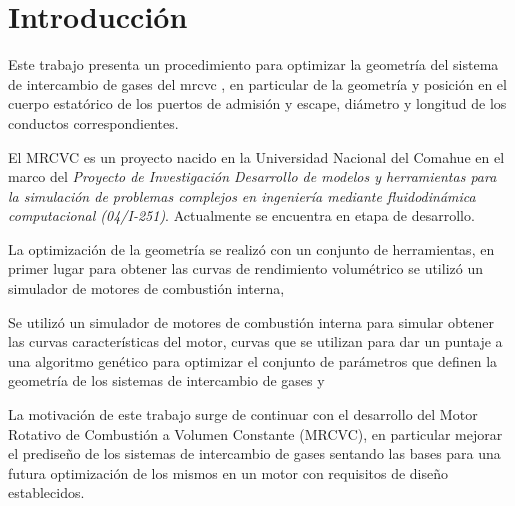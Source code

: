 \chapter{Introducción}

Este trabajo presenta un procedimiento para optimizar la geometría del sistema
de intercambio de gases del \gls{mrcvc}
\cite{toth}, en particular de la geometría y posición en el cuerpo estatórico
de los puertos de admisión y escape, diámetro y longitud de los conductos
correspondientes.

El MRCVC es un proyecto nacido en la Universidad Nacional del Comahue en el
marco del \emph{Proyecto de Investigación Desarrollo de modelos y herramientas
para la simulación de problemas complejos en ingeniería mediante
fluidodinámica computacional (04/I-251)}. Actualmente se encuentra en etapa
de desarrollo.

La optimización de la geometría se realizó con un conjunto de herramientas, en
primer lugar para obtener las curvas de rendimiento volumétrico se utilizó un
simulador de motores de combustión interna, 

Se utilizó un simulador de motores de combustión interna para simular obtener
las curvas características del motor, curvas que se utilizan para dar un
puntaje a una algoritmo genético para optimizar el conjunto de parámetros que
definen la geometría de los sistemas de intercambio de gases y 

La motivación de este trabajo surge de continuar con el desarrollo del Motor
Rotativo de Combustión a Volumen Constante (MRCVC), en particular
mejorar el prediseño de los sistemas de intercambio de gases sentando las bases
para una futura optimización de los mismos en un motor con requisitos de diseño
establecidos.
